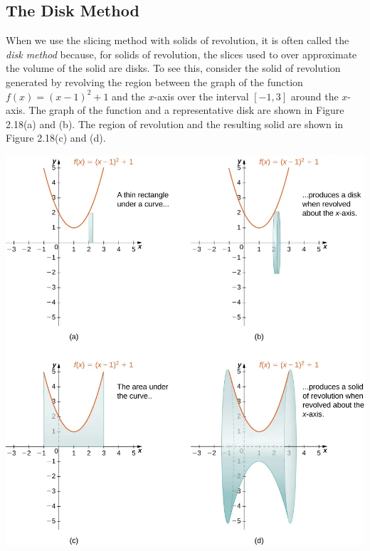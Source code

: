 \documentclass{report}
\begin{document}
    \pagebreak 
    \subsection*{The Disk Method}
    \bigbreak \noindent 
    \smallbreak \noindent
    \begin{definition}
            When we use the slicing method with solids of revolution, it is often called the \textit{disk method} because, for solids of revolution, the slices used to over approximate the volume of the solid are disks. To see this, consider the solid of revolution generated by revolving the region between the graph of the function \( f(x) = (x - 1)^{2} + 1 \) and the \( x \)-axis over the interval \([ -1, 3 ]\) around the \( x \)-axis. The graph of the function and a representative disk are shown in Figure 2.18(a) and (b). The region of revolution and the resulting solid are shown in Figure 2.18(c) and (d).
    \end{definition}
    \bigbreak \noindent 
    \begin{center}
        \includegraphics[scale=0.5]{./figures/graph22.png}
    \end{center}
\end{document}

